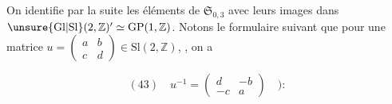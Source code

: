 On identifie par la suite les éléments de $\mathfrak S_{0,3}$ avec leurs images dans
$\unsure{\mathrm{Gl}|\mathrm{Sl}}(2,\mathbb Z)'\simeq\mathrm{GP}(1,\mathbb Z)$.
Notons le formulaire suivant  que pour une matrice
$u=\begin{pmatrix}a&b\\c&d\end{pmatrix}\in\mathrm{Sl}(2,\mathbb Z)$,
, on a


\[
(43)\quad u^{-1}=\begin{pmatrix}d&-b\\-c&a\end{pmatrix}\quad):
\]


